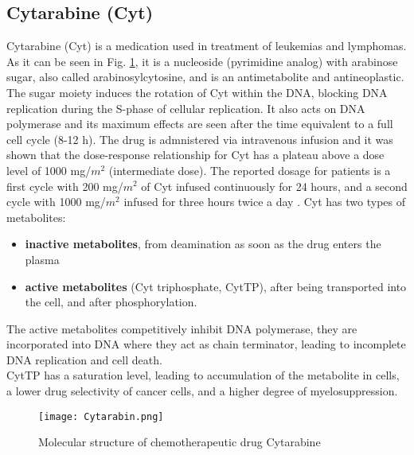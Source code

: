 \subsection{Cytarabine (Cyt)}
Cytarabine (Cyt) is a medication used in treatment of leukemias and lymphomas. As it can be seen in Fig. \ref{fig:Cyt}, it is a nucleoside (pyrimidine analog) with arabinose sugar, also called arabinosylcytosine, and is an antimetabolite and antineoplastic.
The sugar moiety induces the rotation of Cyt within the DNA, blocking DNA replication during the S-phase of cellular replication. It also acts on DNA polymerase and its maximum effects are seen after the time equivalent to a full cell cycle (8-12 h). 
The drug is admnistered via intravenous infusion and it was shown that the dose-response relationship for Cyt has a plateau above a dose level of 1000 mg/$m^2$ (intermediate dose). The reported dosage for patients is a first cycle with 200 mg/$m^2$ of Cyt infused continuously for 24 hours, and a second cycle with 1000 mg/$m^2$ infused for three hours twice a day \cite{cyt-3}.
Cyt has two types of metabolites: 
\begin{itemize}
	\item \textbf{inactive metabolites}, from deamination as soon as the drug enters the plasma
	\item \textbf{active metabolites} (Cyt triphosphate, CytTP), after being transported into the cell, and after phosphorylation.
\end{itemize}
The active metabolites competitively inhibit DNA polymerase, they are incorporated into DNA where they act as chain terminator, leading to incomplete DNA replication and cell death.\\
CytTP has a saturation level, leading to accumulation of the metabolite in cells, a lower drug selectivity of cancer cells, and a higher degree of myelosuppression.\cite{cyt-1, cyt-2}
\begin{figure}[htbp!]
	\centering
	\texttt{[image: Cytarabin.png]}
	\caption{Molecular structure of chemotherapeutic drug Cytarabine}
	\label{fig:Cyt}
\end{figure}

